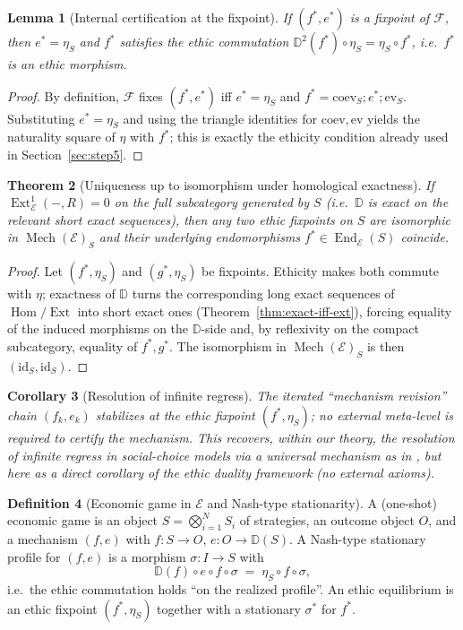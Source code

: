 \documentclass[12pt]{article}
\DeclareMathOperator{\Mech}{Mech}
\newcommand{\E}{\mathcal{E}}
\newcommand{\DD}{\mathbb{D}}
\newcommand{\Hom}{\operatorname{Hom}}
\newcommand{\End}{\operatorname{End}}
\newcommand{\Ext}{\operatorname{Ext}}
\newcommand{\id}{\mathrm{id}}
\newcommand{\coev}{\mathrm{coev}}
\newcommand{\ev}{\mathrm{ev}}
\theoremstyle{plain}
\newtheorem{theorem}{Theorem}[section]
\newtheorem{lemma}[theorem]{Lemma}
\newtheorem{corollary}[theorem]{Corollary}
\theoremstyle{definition}
\newtheorem{definition}[theorem]{Definition}
\theoremstyle{remark}
\numberwithin{equation}{section}
\begin{document}
\begin{lemma}[Internal certification at the fixpoint]
If $(f^*,e^*)$ is a fixpoint of $\mathcal F$, then $e^*=\eta_S$ and $f^*$ satisfies the ethic commutation $\DD^2(f^*)\circ \eta_S=\eta_S\circ f^*$, i.e.\ $f^*$ is an ethic morphism.
\end{lemma}

\begin{proof}
By definition, $\mathcal F$ fixes $(f^*,e^*)$ iff $e^*=\eta_S$ and $f^*=\coev_S; e^*; \ev_S$. Substituting $e^*=\eta_S$ and using the triangle identities for $\coev,\ev$ yields the naturality square of $\eta$ with $f^*$; this is exactly the ethicity condition already used in Section~\ref{sec:step5}.
\end{proof}

\begin{theorem}[Uniqueness up to isomorphism under homological exactness]\label{thm:uniqueness}
If $\Ext^1_\E(-,R)=0$ on the full subcategory generated by $S$ (i.e.\ $\DD$ is exact on the relevant short exact sequences), then any two ethic fixpoints on $S$ are isomorphic in $\Mech(\E)_S$ and their underlying endomorphisms $f^*\in \End_\E(S)$ coincide.
\end{theorem}

\begin{proof}
Let $(f^*,\eta_S)$ and $(g^*,\eta_S)$ be fixpoints. Ethicity makes both commute with $\eta$; exactness of $\DD$ turns the corresponding long exact sequences of $\Hom/\Ext$ into short exact ones (Theorem~\ref{thm:exact-iff-ext}), forcing equality of the induced morphisms on the $\DD$-side and, by reflexivity on the compact subcategory, equality of $f^*,g^*$. The isomorphism in $\Mech(\E)_S$ is then $(\id_S,\id_S)$.
\end{proof}

\begin{corollary}[Resolution of infinite regress]
The iterated “mechanism revision” chain $(f_k,e_k)$ stabilizes at the ethic fixpoint $(f^*,\eta_S)$; no external meta-level is required to certify the mechanism. This recovers, within our theory, the resolution of infinite regress in social-choice models via a universal mechanism as in \cite{Alameddine1990}, but here as a direct corollary of the ethic duality framework (no external axioms).
\end{corollary}

\begin{definition}[Economic game in $\E$ and Nash-type stationarity]
A (one-shot) economic game is an object $S=\bigotimes_{i=1}^N S_i$ of strategies, an outcome object $O$, and a mechanism $(f,e)$ with $f:S\to O$, $e:O\to \DD(S)$. A Nash-type stationary profile for $(f,e)$ is a morphism $\sigma:I\to S$ with
\[
\DD(f)\circ e \circ f \circ \sigma \;=\; \eta_S\circ f\circ \sigma,
\]
i.e.\ the ethic commutation holds “on the realized profile”. An ethic equilibrium is an ethic fixpoint $(f^*,\eta_S)$ together with a stationary $\sigma^*$ for $f^*$.
\end{definition}
\end{document}
